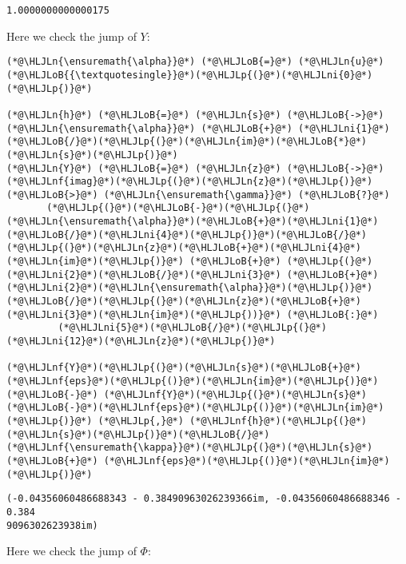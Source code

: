\documentclass[12pt,a4paper]{article}
\newcommand{\HLJLn}[1]{#1}
\newcommand{\HLJLnf}[1]{\textcolor[RGB]{66,102,213}{#1}}
\newcommand{\HLJLni}[1]{\textcolor[RGB]{59,151,46}{#1}}
\newcommand{\HLJLoB}[1]{\textcolor[RGB]{102,102,102}{\textbf{#1}}}
\newcommand{\HLJLp}[1]{#1}
\begin{document}
\begin{lstlisting}
1.0000000000000175
\end{lstlisting}


Here we check the jump of $Y$:


\begin{lstlisting}
(*@\HLJLn{\ensuremath{\alpha}}@*) (*@\HLJLoB{=}@*) (*@\HLJLn{u}@*)(*@\HLJLoB{{\textquotesingle}}@*)(*@\HLJLp{(}@*)(*@\HLJLni{0}@*)(*@\HLJLp{)}@*)

(*@\HLJLn{h}@*) (*@\HLJLoB{=}@*) (*@\HLJLn{s}@*) (*@\HLJLoB{->}@*) (*@\HLJLn{\ensuremath{\alpha}}@*) (*@\HLJLoB{+}@*) (*@\HLJLni{1}@*)(*@\HLJLoB{/}@*)(*@\HLJLp{(}@*)(*@\HLJLn{im}@*)(*@\HLJLoB{*}@*)(*@\HLJLn{s}@*)(*@\HLJLp{)}@*)
(*@\HLJLn{Y}@*) (*@\HLJLoB{=}@*) (*@\HLJLn{z}@*) (*@\HLJLoB{->}@*) (*@\HLJLnf{imag}@*)(*@\HLJLp{(}@*)(*@\HLJLn{z}@*)(*@\HLJLp{)}@*) (*@\HLJLoB{>}@*) (*@\HLJLn{\ensuremath{\gamma}}@*) (*@\HLJLoB{?}@*)
       (*@\HLJLp{(}@*)(*@\HLJLoB{-}@*)(*@\HLJLp{(}@*)(*@\HLJLn{\ensuremath{\alpha}}@*)(*@\HLJLoB{+}@*)(*@\HLJLni{1}@*)(*@\HLJLoB{/}@*)(*@\HLJLni{4}@*)(*@\HLJLp{)}@*)(*@\HLJLoB{/}@*)(*@\HLJLp{(}@*)(*@\HLJLn{z}@*)(*@\HLJLoB{+}@*)(*@\HLJLni{4}@*)(*@\HLJLn{im}@*)(*@\HLJLp{)}@*) (*@\HLJLoB{+}@*) (*@\HLJLp{(}@*)(*@\HLJLni{2}@*)(*@\HLJLoB{/}@*)(*@\HLJLni{3}@*) (*@\HLJLoB{+}@*) (*@\HLJLni{2}@*)(*@\HLJLn{\ensuremath{\alpha}}@*)(*@\HLJLp{)}@*)(*@\HLJLoB{/}@*)(*@\HLJLp{(}@*)(*@\HLJLn{z}@*)(*@\HLJLoB{+}@*)(*@\HLJLni{3}@*)(*@\HLJLn{im}@*)(*@\HLJLp{))}@*) (*@\HLJLoB{:}@*)
         (*@\HLJLni{5}@*)(*@\HLJLoB{/}@*)(*@\HLJLp{(}@*)(*@\HLJLni{12}@*)(*@\HLJLn{z}@*)(*@\HLJLp{)}@*)

(*@\HLJLnf{Y}@*)(*@\HLJLp{(}@*)(*@\HLJLn{s}@*)(*@\HLJLoB{+}@*)(*@\HLJLnf{eps}@*)(*@\HLJLp{()}@*)(*@\HLJLn{im}@*)(*@\HLJLp{)}@*) (*@\HLJLoB{-}@*) (*@\HLJLnf{Y}@*)(*@\HLJLp{(}@*)(*@\HLJLn{s}@*)(*@\HLJLoB{-}@*)(*@\HLJLnf{eps}@*)(*@\HLJLp{()}@*)(*@\HLJLn{im}@*)(*@\HLJLp{)}@*) (*@\HLJLp{,}@*) (*@\HLJLnf{h}@*)(*@\HLJLp{(}@*)(*@\HLJLn{s}@*)(*@\HLJLp{)}@*)(*@\HLJLoB{/}@*)(*@\HLJLnf{\ensuremath{\kappa}}@*)(*@\HLJLp{(}@*)(*@\HLJLn{s}@*) (*@\HLJLoB{+}@*) (*@\HLJLnf{eps}@*)(*@\HLJLp{()}@*)(*@\HLJLn{im}@*)(*@\HLJLp{)}@*)
\end{lstlisting}

\begin{lstlisting}
(-0.04356060486688343 - 0.38490963026239366im, -0.04356060486688346 - 0.384
9096302623938im)
\end{lstlisting}


Here we check the jump of $\Phi$:
\end{document}
